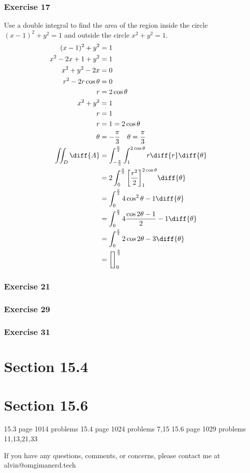 \documentclass{math}
\begin{document}
\subsubsection*{Exercise 17}
Use a double integral to find the area of the region inside the circle
\( (x-1)^2+y^2 = 1 \) and outside the circle \( x^2+y^2 = 1 \).
\begin{align*}
  (x-1)^2+y^2 &= 1 \\
  x^2-2x+1+y^2 &= 1 \\
  x^2+y^2-2x &= 0 \\
  r^2-2r\cos\theta &= 0 \\
  r &= 2\cos\theta \\
  x^2+y^2 &= 1 \\
  r &= 1 \\
  r &= 1 = 2\cos\theta \\
  \theta &= -\frac{\pi}{3} \quad \theta = \frac{\pi}{3} \\
  \iint_{D}\diff{A} &= \int_{-\frac{\pi}{3}}^{\frac{\pi}{3}}
    \int_{1}^{2\cos\theta}r\diff{r}\diff{\theta} \\
  &= 2\int_{0}^{\frac{\pi}{3}}
    \bigg[\frac{r^2}{2}\bigg]_{1}^{2\cos\theta}\diff{\theta} \\
  &= \int_{0}^{\frac{\pi}{3}}4\cos^2\theta-1\diff{\theta} \\
  &= \int_{0}^{\frac{\pi}{3}}4\frac{\cos2\theta-1}{2}-1\diff{\theta} \\
  &= \int_{0}^{\frac{\pi}{3}}2\cos2\theta-3\diff{\theta} \\
  &= \bigg[\bigg]_{0}^{\frac{\pi}{3}}
\end{align*}

\subsubsection*{Exercise 21}
\subsubsection*{Exercise 29}
\subsubsection*{Exercise 31}

\section*{Section 15.4}

\section*{Section 15.6}


15.3     page 1014    problems
15.4     page 1024    problems   7,15
15.6     page 1029   problems   11,13,21,33​

\begin{center}
  If you have any questions, comments, or concerns, please contact me at
  alvin@omgimanerd.tech
\end{center}
\end{document}
